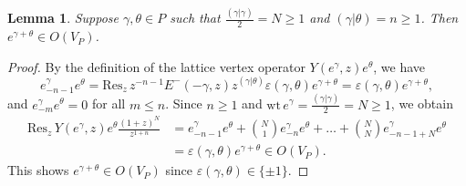\documentclass[12pt,a4paper,reqno]{amsart}
\numberwithin{equation}{section}
\numberwithin{equation}{section}
\newtheorem{lm}[thm]{Lemma}
\theoremstyle{definition}
\begin{document}
	\begin{lm}\label{lm4.1}
		Suppose $\gamma,\theta\in P$ such that $\frac{(\gamma|\gamma)}{2}=N\geq 1$ and $(\gamma|\theta)=n\geq 1$. Then $e^{\gamma+\theta}\in O(V_P)$.
	\end{lm}
	\begin{proof}
		By the definition of the lattice vertex operator $Y(e^\gamma,z)e^\theta$, we have 
		\[
		e^\gamma_{-n-1}e^\theta
		=\mathrm{Res}_{z}\, z^{-n-1}E^{-}(-\gamma,z)z^{(\gamma|\theta)}\varepsilon(\gamma,\theta)e^{\gamma+\theta}
		=\varepsilon(\gamma,\theta)e^{\gamma+\theta},
		\]
		and $e^{\gamma}_{-m}e^\theta=0$ for all $m\leq n$. Since $n\geq 1$ and $\mathrm{wt}\,e^\gamma=\frac{(\gamma|\gamma)}{2}=N\geq 1$, we obtain
		\begin{align*}
			\mathrm{Res}_{z}\, Y(e^{\gamma},z)e^{\theta} \frac{(1+z)^N}{z^{1+n}}
			&=e^\gamma_{-n-1}e^\theta+\binom{N}{1}e^\gamma_{-n}e^\theta+\dots+\binom{N}{N}e^\gamma_{-n-1+N}e^\theta\\
			&=\varepsilon(\gamma,\theta)e^{\gamma+\theta}\in O(V_P).
		\end{align*}
		This shows $e^{\gamma+\theta}\in O(V_P)$ since $\varepsilon(\gamma,\theta)\in\{\pm1\}$.
	\end{proof}
	
\end{document}

